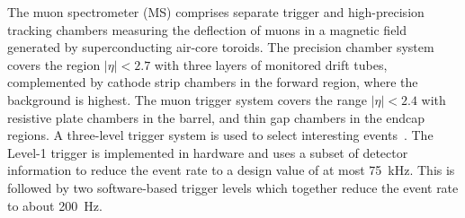 The muon spectrometer (MS) comprises separate trigger and
high-precision tracking chambers measuring the deflection of muons in a magnetic field generated by superconducting air-core toroids.
The precision chamber system covers the region $|\eta| < 2.7$ with three layers of monitored drift tubes,
complemented by cathode strip chambers in the forward region, where the background is highest.
The muon trigger system covers the range $|\eta| < 2.4$ with resistive plate chambers in the barrel, and thin gap chambers in the endcap regions.
A three-level trigger system is used to select interesting events~\cite{PERF-2011-02}.
The Level-1 trigger is implemented in hardware and uses a subset of detector information
to reduce the event rate to a design value of at most \SI{75}{\kHz}.
This is followed by two software-based trigger levels which together reduce the event rate to about \SI{200}{\Hz}.

